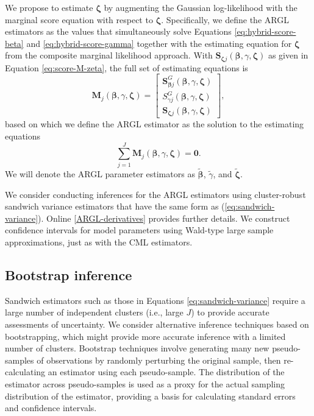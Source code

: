 \documentclass[
  american,
  man, donotrepeattitle,floatsintext]{apa7}
\begin{document}
We propose to estimate \(\boldsymbol\zeta\) by augmenting the Gaussian log-likelihood with the marginal score equation with respect to \(\boldsymbol\zeta\).
Specifically, we define the ARGL estimators as the values that simultaneously solve Equations \eqref{eq:hybrid-score-beta} and \eqref{eq:hybrid-score-gamma} together with the estimating equation for \(\boldsymbol\zeta\) from the composite marginal likelihood approach.
With \(\mathbf{S}_{\boldsymbol\zeta j}\left(\boldsymbol{\beta}, \gamma, \boldsymbol{\zeta}\right)\) as given in Equation \eqref{eq:score-M-zeta}, the full set of estimating equations is
\begin{equation}
\label{eq:hybrid-score}
\mathbf{M}_j(\boldsymbol\beta, \gamma, \boldsymbol\zeta) = \left[\begin{array}{c} \mathbf{S}^G_{\boldsymbol\beta j}(\boldsymbol\beta, \gamma, \boldsymbol\zeta) \\ S^G_{\gamma j}(\boldsymbol\beta, \gamma, \boldsymbol\zeta) \\ \mathbf{S}_{\boldsymbol\zeta j}(\boldsymbol\beta, \gamma, \boldsymbol\zeta) \end{array}\right],
\end{equation}
based on which we define the ARGL estimator as the solution to the estimating equations
\begin{equation}
\label{eq:hybrid-total-score}
\sum_{j=1}^J \mathbf{M}_j(\boldsymbol\beta, \gamma, \boldsymbol\zeta) = \mathbf{0}.
\end{equation}
We will denote the ARGL parameter estimators as \(\boldsymbol{\tilde\beta}\), \(\tilde\gamma\), and \(\boldsymbol{\tilde\zeta}\).

We consider conducting inferences for the ARGL estimators using cluster-robust sandwich variance estimators that have the same form as (\ref{eq:sandwich-variance}).
Online \ref{ARGL-derivatives} provides further details.
We construct confidence intervals for model parameters using Wald-type large sample approximations, just as with the CML estimators.

\subsection{Bootstrap inference}\label{bootstrap-inference}

Sandwich estimators such as those in Equations \eqref{eq:sandwich-variance} require a large number of independent clusters (i.e., large \(J\)) to provide accurate assessments of uncertainty.
We consider alternative inference techniques based on bootstrapping, which might provide more accurate inference with a limited number of clusters.
Bootstrap techniques involve generating many new pseudo-samples of observations by randomly perturbing the original sample, then re-calculating an estimator using each pseudo-sample.
The distribution of the estimator across pseudo-samples is used as a proxy for the actual sampling distribution of the estimator, providing a basis for calculating standard errors and confidence intervals.
\end{document}
